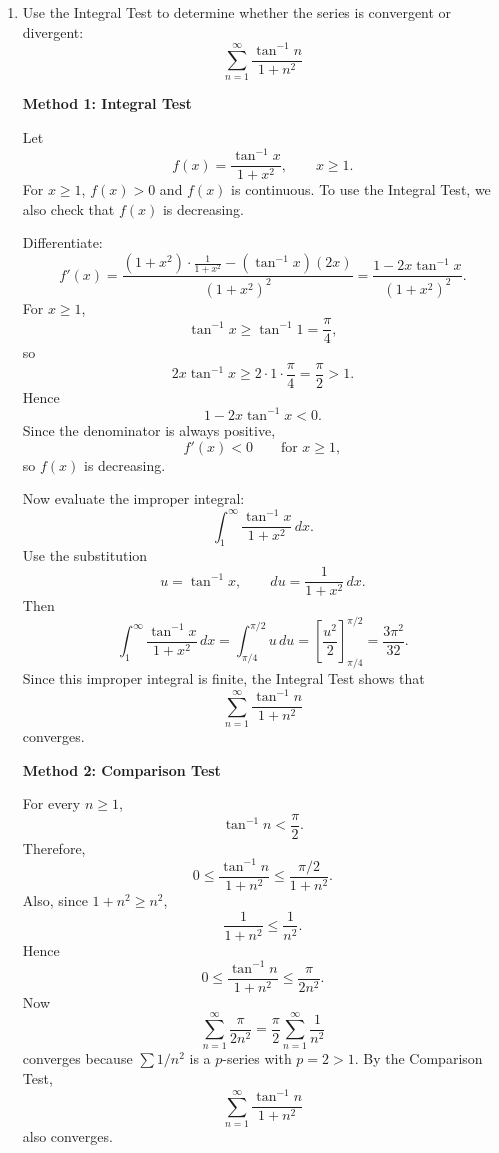 \documentclass[a4paper,12pt,twocolumn]{article}
\newenvironment{solutionbox}{\begin{framed}}{\end{framed}}
\begin{document}
\begin{enumerate}[label=\textbf{\arabic*.}, leftmargin=2em, itemsep=1.2em]
\begin{solutionbox}
\textbf{Method 2: Comparison with a convergent geometric series}

For sufficiently large \(n\), we have
\[
n^2\le e^n.
\]
Therefore,
\[
n^2e^{-n^3}\le e^n e^{-n^3}=e^{\,n-n^3}.
\]
Since \(n^3-n\ge n\) for all sufficiently large \(n\),
\[
e^{\,n-n^3}\le e^{-n}.
\]
Hence, for all sufficiently large \(n\),
\[
0\le n^2e^{-n^3}\le e^{-n}.
\]
But
\[
\sum_{n=1}^{\infty} e^{-n}
\]
is a geometric series with ratio \(1/e<1\), so it converges. By the Comparison Test,
\[
\sum_{n=1}^{\infty} n^2 e^{-n^3}
\]
also converges.

\medskip
\textbf{Answer:}
\[
\boxed{\sum_{n=1}^{\infty} n^2 e^{-n^3}\text{ converges}.}
\]
\end{solutionbox}

\setcounter{enumi}{9}
\item Use the Integral Test to determine whether the series is convergent or divergent:
\[
\sum_{n=1}^{\infty}\frac{\tan^{-1} n}{1+n^2}
\]

\begin{solutionbox}
\textbf{Method 1: Integral Test}

Let
\[
f(x)=\frac{\tan^{-1}x}{1+x^2}, \qquad x\ge 1.
\]
For \(x\ge 1\), \(f(x)>0\) and \(f(x)\) is continuous. To use the Integral Test, we also check that \(f(x)\) is decreasing.

Differentiate:
\[
f'(x)=\frac{(1+x^2)\cdot \frac{1}{1+x^2}-(\tan^{-1}x)(2x)}{(1+x^2)^2}
=\frac{1-2x\tan^{-1}x}{(1+x^2)^2}.
\]
For \(x\ge 1\),
\[
\tan^{-1}x\ge \tan^{-1}1=\frac{\pi}{4},
\]
so
\[
2x\tan^{-1}x\ge 2\cdot 1\cdot \frac{\pi}{4}=\frac{\pi}{2}>1.
\]
Hence
\[
1-2x\tan^{-1}x<0.
\]
Since the denominator is always positive,
\[
f'(x)<0 \qquad \text{for } x\ge 1,
\]
so \(f(x)\) is decreasing.

Now evaluate the improper integral:
\[
\int_1^\infty \frac{\tan^{-1}x}{1+x^2}\,dx.
\]
Use the substitution
\[
u=\tan^{-1}x, \qquad du=\frac{1}{1+x^2}\,dx.
\]
Then
\[
\int_1^\infty \frac{\tan^{-1}x}{1+x^2}\,dx
=
\int_{\pi/4}^{\pi/2} u\,du
=
\left[\frac{u^2}{2}\right]_{\pi/4}^{\pi/2}
=
\frac{3\pi^2}{32}.
\]
Since this improper integral is finite, the Integral Test shows that
\[
\sum_{n=1}^{\infty}\frac{\tan^{-1} n}{1+n^2}
\]
converges.
\end{solutionbox}

\begin{solutionbox}
\textbf{Method 2: Comparison Test}

For every \(n\ge 1\),
\[
\tan^{-1}n<\frac{\pi}{2}.
\]
Therefore,
\[
0\le \frac{\tan^{-1}n}{1+n^2}
\le \frac{\pi/2}{1+n^2}.
\]
Also, since \(1+n^2\ge n^2\),
\[
\frac{1}{1+n^2}\le \frac{1}{n^2}.
\]
Hence
\[
0\le \frac{\tan^{-1}n}{1+n^2}
\le \frac{\pi}{2n^2}.
\]
Now
\[
\sum_{n=1}^{\infty}\frac{\pi}{2n^2}
=
\frac{\pi}{2}\sum_{n=1}^{\infty}\frac{1}{n^2}
\]
converges because \(\sum 1/n^2\) is a \(p\)-series with \(p=2>1\). By the Comparison Test,
\[
\sum_{n=1}^{\infty}\frac{\tan^{-1} n}{1+n^2}
\]
also converges.


\end{solutionbox}
\end{enumerate}
\end{document}
